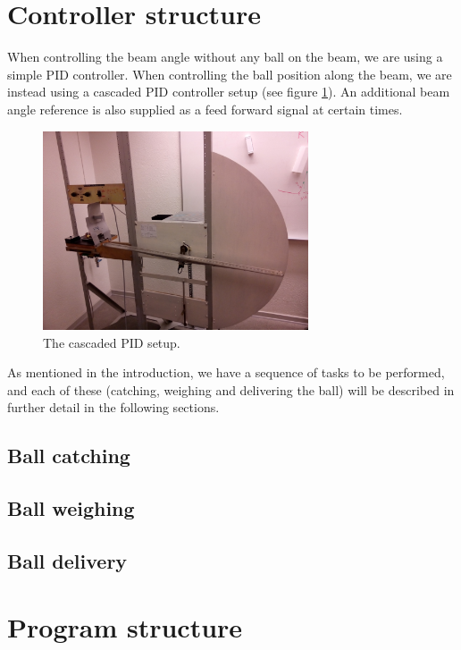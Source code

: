 \documentclass{article}
\begin{document}
\section{Controller structure}
When controlling the beam angle without any ball on the beam, we are using a simple PID controller. When controlling the ball position along the beam, we are instead using a cascaded PID controller setup (see figure \ref{cascaded_pid_fig}). An additional beam angle reference is also supplied as a feed forward signal at certain times.
\begin{figure}
\centering
\includegraphics[width=0.7\textwidth]{figures/process_fig.jpg}
\caption{The cascaded PID setup.}\label{cascaded_pid_fig}
\end{figure}

As mentioned in the introduction, we have a sequence of tasks to be performed, and each of these (catching, weighing and delivering the ball) will be described in further detail in the following sections.

\subsection{Ball catching}


\subsection{Ball weighing}


\subsection{Ball delivery}


\section{Program structure}
\end{document}
